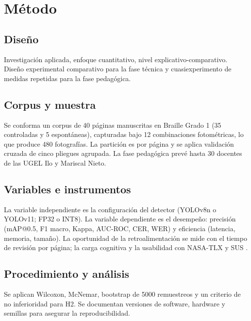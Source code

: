 \section{Método}

\subsection{Diseño}
Investigación aplicada, enfoque cuantitativo, nivel explicativo-comparativo.
Diseño experimental comparativo para la fase técnica y cuasiexperimento de medidas
repetidas para la fase pedagógica.

\subsection{Corpus y muestra}
Se conforma un corpus de 40 páginas manuscritas en Braille Grado 1 (35
controladas y 5 espontáneas), capturadas bajo 12 combinaciones fotométricas, lo
que produce 480 fotografías. La partición es por página y se aplica validación
cruzada de cinco pliegues agrupada. La fase pedagógica prevé hasta 30 docentes de
las UGEL Ilo y Mariscal Nieto.

\subsection{Variables e instrumentos}
La variable independiente es la configuración del detector (YOLOv8n o YOLOv11;
FP32 o INT8). La variable dependiente es el desempeño: precisión (mAP@0.5, F1
macro, Kappa, AUC-ROC, CER, WER) y eficiencia (latencia, memoria, tamaño). La
oportunidad de la retroalimentación se mide con el tiempo de revisión por página;
la carga cognitiva y la usabilidad con NASA-TLX \parencite{hart1988} y SUS
\parencite{brooke1996}.

\subsection{Procedimiento y análisis}
Se aplican Wilcoxon, McNemar, bootstrap de 5000 remuestreos y un criterio de no
inferioridad para H2. Se documentan versiones de software, hardware y semillas
para asegurar la reproducibilidad.
